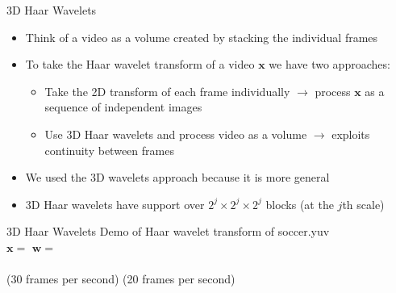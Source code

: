 \documentclass[xcolor=table]{beamer}
\numberwithin{equation}{section}
\let\bs\boldsymbol
\begin{document}
\begin{frame}{3D Haar Wavelets}
\begin{itemize}%
\item Think of a video as a volume created by stacking the individual frames
\item To take the Haar wavelet transform of a video $\bs x$ we have two approaches:
\begin{itemize}
\item Take the 2D transform of each frame individually $\rightarrow$ process $\bs x$ as a sequence of independent images
\item Use 3D Haar wavelets and process video as a volume $\rightarrow$ exploits continuity between frames
\end{itemize}
\item We used the 3D wavelets approach because it is more general
\item 3D Haar wavelets have support over $2^j\times2^j\times2^j$ blocks (at the $j$th scale)
\end{itemize}
\end{frame}

\begin{frame}{3D Haar Wavelets}
\hspace{0.6in}Demo of Haar wavelet transform of soccer.yuv\\
\hspace{0.8in}$\bs x = $ \hspace{2in}$\bs w = $\\
\,
\\
\hspace{0.4in}(30 frames per second) \hspace{0.8in}(20 frames per second)
\end{frame}
\end{document}
